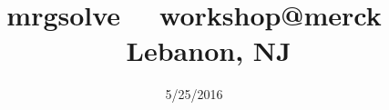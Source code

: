 \title{mrgsolve \ \  workshop@merck \ \  Lebanon, NJ} 
\date{5/25/2016} 

\newcommand{\stcolums}{\begin{columns}}
\newcommand{\fincolums}{\end{columns}}
\newcommand{\stcolum}{\begin{column}}
\newcommand{\fincolum}{\end{column}}
\newcommand{\stblock}{\begin{block}}
\newcommand{\finblock}{\end{block}}
\newcommand{\red}[1]{\textcolor{myred}{\tt #1}}
\newcommand{\redtt}[1]{\textcolor{myred}{\texttt{\textbf{#1}}}}
\newcommand{\redb}[1]{\red{{\bf #1}}}
\newcommand{\grb}[1]{\textcolor{mrggreen}{\bf #1}}
\newcommand{\ttg}[1]{\textcolor{mrggreen}{\bf \tt #1}}
\newcommand{\ttgb}[1]{\textcolor{mrggreen}{\texttt{\textbf{#1}}}}
\newcommand{\mrgsolve}{\ttg{mrgsolve}}
\newcommand{\ttdsb}[1]{\textcolor{darkslateblue}{\texttt{\textbf{#1}}}}
\newcommand{\dsbb}[1]{\textcolor{darkslateblue}{\textbf{#1}}}
\newcommand{\blkb}[1]{\textcolor{black}{\textbf{#1}}}


\newcommand{\welcometitle}[1]{
\vskip 1cm
\centerline{\texttt{[image: docs/src/img/logo]}}
\vskip 1cm
\centerline{\LARGE{\textcolor{mrggreen}{\tt mrgsolve}: #1}}

\vskip 2.2cm

 \centerline{\textcolor{mrggreen2}{{\tt mrgsolve} Workshop -at- Merck}}
 \centerline{\today}
}
\newcommand{\mytitle}[1]{
\vskip 1cm
\centerline{\texttt{[image: img/logo]}}
\vskip 1cm
\centerline{\LARGE{\textcolor{mrggreen}{\tt mrgsolve}: #1}}

\vskip 2.2cm

 \centerline{\textcolor{mrggreen2}{{\tt mrgsolve} Workshop -at- Merck}}
 \centerline{\today}
}

